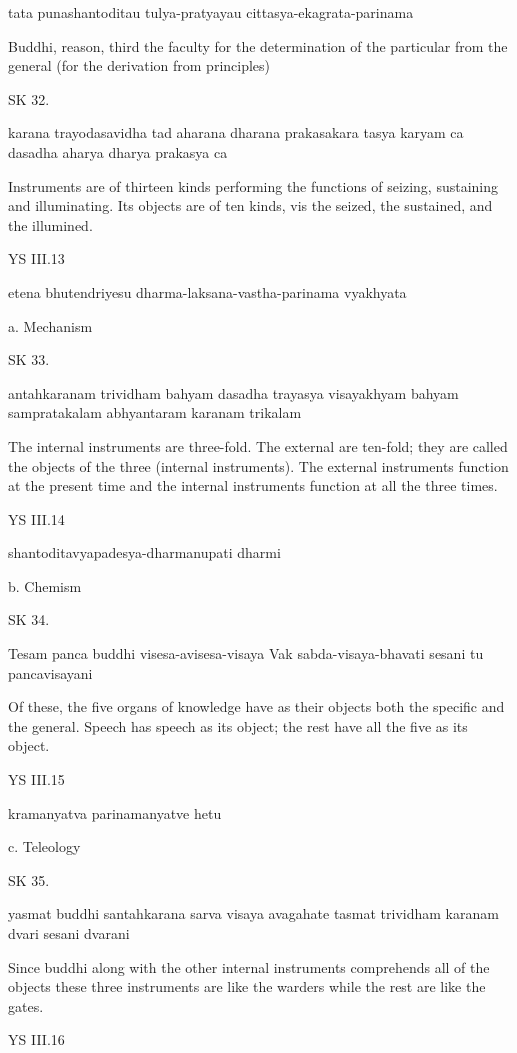     tata punashantoditau tulya-pratyayau cittasya-ekagrata-parinama

    Buddhi, reason, third the faculty for the determination of
    the particular from the general (for the derivation from principles)


SK 32.

karana trayodasavidha tad aharana dharana prakasakara
tasya karyam ca dasadha aharya dharya prakasya ca

Instruments are of thirteen kinds performing the functions of
seizing, sustaining and illuminating.
Its objects are of ten kinds, vis
the seized, the sustained, and the illumined.

YS III.13

    etena bhutendriyesu dharma-laksana-vastha-parinama vyakhyata

    a. Mechanism

SK 33.

antahkaranam trividham bahyam dasadha trayasya visayakhyam
bahyam sampratakalam abhyantaram karanam trikalam

The internal instruments are three-fold.
The external are ten-fold;
they are called the objects of the three (internal instruments).
The external instruments function at the present time and
the internal instruments function at all the three times.

YS III.14

    shantoditavyapadesya-dharmanupati dharmi

    b. Chemism

SK 34.

Tesam panca buddhi visesa-avisesa-visaya
Vak sabda-visaya-bhavati sesani tu pancavisayani

Of these, the five organs of knowledge have as their objects
both the specific and the general.
Speech has speech as its object;
the rest have all the five as its object.

YS III.15

    kramanyatva parinamanyatve hetu

    c. Teleology

SK 35.

yasmat buddhi santahkarana sarva visaya avagahate
tasmat trividham karanam dvari sesani dvarani

Since buddhi along with the other internal instruments
comprehends all of the objects these three instruments are
like the warders while the rest are like the gates.

YS III.16

